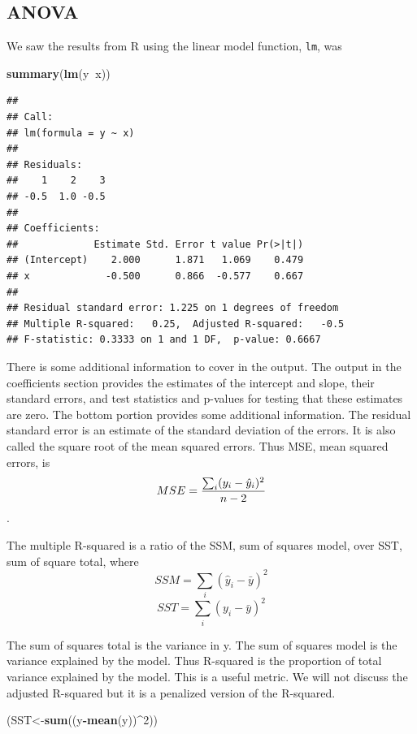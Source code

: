 \documentclass[]{book}
\newenvironment{Shaded}{\begin{snugshade}}{\end{snugshade}}
\newcommand{\KeywordTok}[1]{\textcolor[rgb]{0.13,0.29,0.53}{\textbf{#1}}}
\newcommand{\DecValTok}[1]{\textcolor[rgb]{0.00,0.00,0.81}{#1}}
\newcommand{\OperatorTok}[1]{\textcolor[rgb]{0.81,0.36,0.00}{\textbf{#1}}}
\newcommand{\NormalTok}[1]{#1}
\theoremstyle{definition}
\theoremstyle{definition}
\theoremstyle{definition}
\theoremstyle{remark}
\begin{document}
\subsection{ANOVA}\label{anova}

We saw the results from R using the linear model function, \texttt{lm},
was

\begin{Shaded}
\begin{Highlighting}[]
\KeywordTok{summary}\NormalTok{(}\KeywordTok{lm}\NormalTok{(y}\OperatorTok{~}\NormalTok{x))}
\end{Highlighting}
\end{Shaded}

\begin{verbatim}
## 
## Call:
## lm(formula = y ~ x)
## 
## Residuals:
##    1    2    3 
## -0.5  1.0 -0.5 
## 
## Coefficients:
##             Estimate Std. Error t value Pr(>|t|)
## (Intercept)    2.000      1.871   1.069    0.479
## x             -0.500      0.866  -0.577    0.667
## 
## Residual standard error: 1.225 on 1 degrees of freedom
## Multiple R-squared:   0.25,  Adjusted R-squared:   -0.5 
## F-statistic: 0.3333 on 1 and 1 DF,  p-value: 0.6667
\end{verbatim}

There is some additional information to cover in the output. The output
in the coefficients section provides the estimates of the intercept and
slope, their standard errors, and test statistics and p-values for
testing that these estimates are zero. The bottom portion provides some
additional information. The residual standard error is an estimate of
the standard deviation of the errors. It is also called the square root
of the mean squared errors. Thus MSE, mean squared errors, is
\[MSE={\sum_{i}(y_{i}-\hat{y}_{i})^{2} \over n-2}\].

The multiple R-squared is a ratio of the SSM, sum of squares model, over
SST, sum of square total, where
\[SSM=\sum_{i}(\hat{y}_{i}-\bar{y})^{2} \]
\[SST=\sum_{i}(y_{i}-\bar{y})^{2}\]

The sum of squares total is the variance in y. The sum of squares model
is the variance explained by the model. Thus R-squared is the proportion
of total variance explained by the model. This is a useful metric. We
will not discuss the adjusted R-squared but it is a penalized version of
the R-squared.

\begin{Shaded}
\begin{Highlighting}[]
\NormalTok{(SST<-}\KeywordTok{sum}\NormalTok{((y}\OperatorTok{-}\KeywordTok{mean}\NormalTok{(y))}\OperatorTok{^}\DecValTok{2}\NormalTok{))}
\end{Highlighting}
\end{Shaded}
\end{document}
